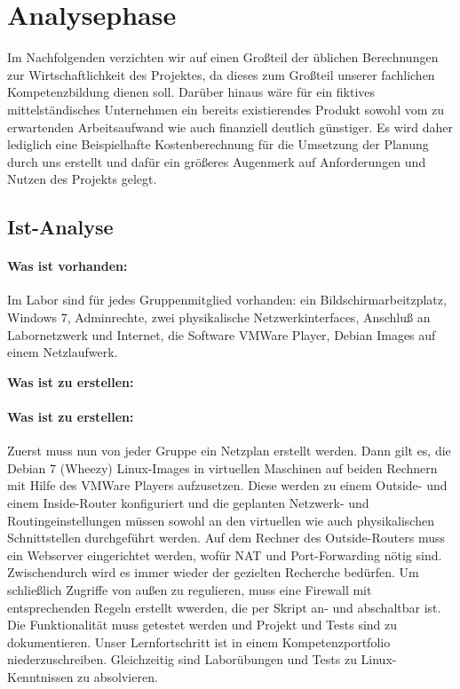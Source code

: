 \section{Analysephase} 
\label{sec:Analysephase}

Im Nachfolgenden verzichten wir auf einen Großteil der üblichen Berechnungen zur Wirtschaftlichkeit des Projektes, da dieses zum Großteil unserer fachlichen Kompetenzbildung dienen soll. Darüber hinaus wäre für ein fiktives mittelständisches Unternehmen ein bereits existierendes Produkt sowohl vom zu erwartenden Arbeitsaufwand wie auch finanziell deutlich günstiger. Es wird daher lediglich eine Beispielhafte Kostenberechnung für die Umsetzung der Planung durch uns erstellt und dafür ein größeres Augenmerk auf Anforderungen und Nutzen des Projekts gelegt. 

\subsection{Ist-Analyse} 
\label{sec:IstAnalyse}

\paragraph*{Was ist vorhanden: } Im Labor sind für jedes Gruppenmitglied vorhanden: ein Bildschirmarbeitzplatz, Windows 7, Adminrechte, zwei physikalische Netzwerkinterfaces, Anschluß an Labornetzwerk und Internet, die Software VMWare Player, Debian Images auf einem Netzlaufwerk.
    
    \textbf{Was ist zu erstellen:}\\
\paragraph*{Was ist zu erstellen: } Zuerst muss nun von jeder Gruppe ein Netzplan erstellt werden. Dann gilt es, die Debian 7 (Wheezy) Linux-Images in virtuellen Maschinen auf beiden Rechnern mit Hilfe des VMWare Players aufzusetzen. Diese werden zu einem Outside- und einem Inside-Router konfiguriert und die geplanten Netzwerk- und Routingeinstellungen müssen sowohl an den virtuellen wie auch physikalischen Schnittstellen durchgeführt werden. Auf dem Rechner des Outside-Routers muss ein Webserver eingerichtet werden, wofür NAT und Port-Forwarding nötig sind. Zwischendurch wird es immer wieder der gezielten Recherche bedürfen. Um schließlich Zugriffe von außen zu regulieren, muss eine Firewall mit entsprechenden Regeln erstellt wwerden, die per Skript an- und abschaltbar ist. Die Funktionalität muss getestet werden und Projekt und Tests sind zu dokumentieren. Unser Lernfortschritt ist in einem Kompetenzportfolio niederzuschreiben. Gleichzeitig sind Laborübungen und Tests zu Linux-Kenntnissen zu absolvieren.


